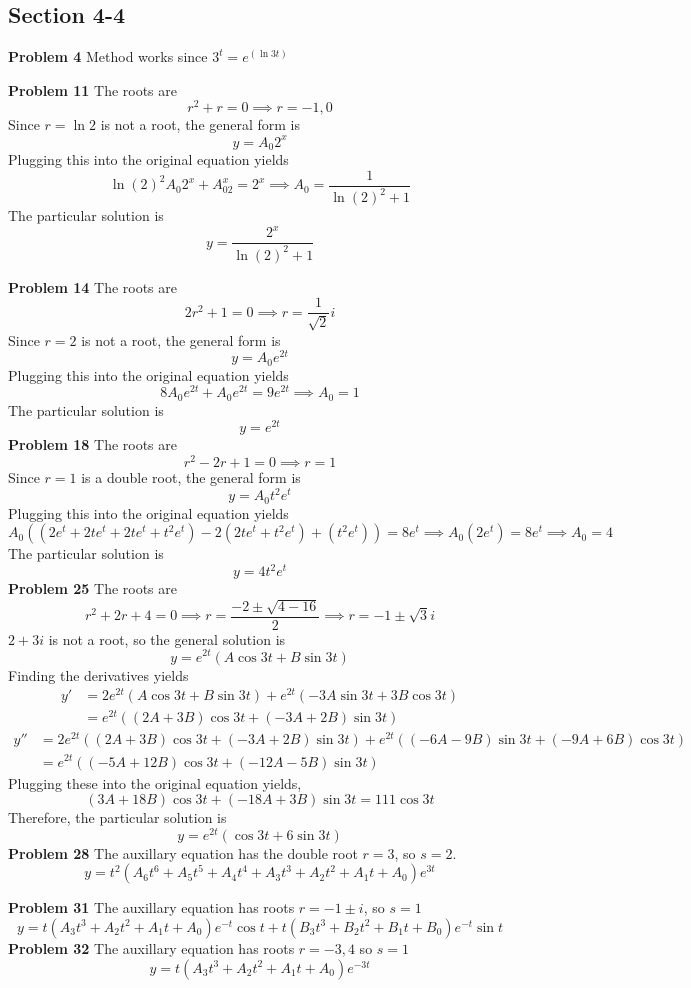 \subsection*{Section 4-4}
\textbf{Problem 4}
Method works since $3^t = e^(\ln 3 t)$

\textbf{Problem 11}
The roots are 
\[
    r^2 + r = 0 \implies r=-1, 0
\]
Since $r=\ln2$ is not a root, the general form is 
\[
    y = A_0 2^x
\]
Plugging this into the original equation yields 
\[
    \ln(2)^2 A_0 2^x + A_02^x = 2^x
    \implies A_0 = \frac{1}{\ln(2)^2+1}
\]
The particular solution is 
\[
    y = \frac{2^x}{\ln(2)^2+1}
\]

\textbf{Problem 14}
The roots are 
\[
    2r^2 + 1 = 0 \implies r = \frac{1}{\sqrt{2}}i
\]
Since $r = 2$ is not a root, the general form is 
\[
    y = A_0 e^{2t}
\]
Plugging this into the original equation yields 
\[
    8A_0e^{2t} + A_0 e^{2t} = 9e^{2t}
    \implies A_0 = 1
\]
The particular solution is 
\[
    y = e^{2t}
\]
\textbf{Problem 18}
The roots are 
\[
    r^2-2r+1 = 0
    \implies r=1
\]
Since $r=1$ is a double root, the general form is 
\[
    y = A_0 t^2e^t
\]
Plugging this into the original equation yields 
\[
    A_0((2e^t+ 2te^t + 2te^t + t^2e^t) - 2(2te^t + t^2e^t) + (t^2e^t)) = 8e^t
    \implies A_0(2e^t) = 8e^t
    \implies A_0 = 4
\]
The particular solution is 
\[
    y = 4 t^2e^t
\]
\textbf{Problem 25}
The roots are 
\[
    r^2 + 2r + 4 = 0 
    \implies r = \frac{-2 \pm \sqrt{4-16}}{2}
    \implies r = -1 \pm \sqrt{3}i
\]
$2 + 3i$ is not a root, so the general solution is 
\[
    y = e^{2t}(A \cos 3t + B \sin 3t)
\]
Finding the derivatives yields
\begin{align*}
    y' 
    &= 2e^{2t}(A \cos 3t + B \sin 3t) + e^{2t}(-3A \sin 3t + 3B \cos 3t) \\
    &= e^{2t}((2A+3B)\cos 3t + (-3A+2B) \sin 3t)
\end{align*}
\begin{align*}
    y''
    &= 2e^{2t}((2A+3B)\cos 3t + (-3A+2B) \sin 3t) + e^{2t}((-6A-9B)\sin 3t + (-9A+6B) \cos 3t) \\
    &= e^{2t}((-5A+12B)\cos 3t + (-12A-5B) \sin 3t)
\end{align*}
Plugging these into the original equation yields,
\[
    (3A+18B)\cos 3t + (-18A+3B)\sin 3t = 111 \cos 3t
\]
Therefore, the particular solution is 
\[
    y = e^{2t}(\cos 3t + 6 \sin 3t)
\]
\textbf{Problem 28}
The auxillary equation has the double root $r=3$, so $s=2$.
\[
    y = t^2(A_6t^6+A_5t^5+A_4t^4+A_3t^3+A_2t^2+A_1t+A_0)e^{3t}
\]

\textbf{Problem 31}
The auxillary equation has roots $r = -1 \pm i$, so $s=1$
\[
    y = t(A_3t^3+A_2t^2+A_1t+A_0)e^{-t}\cos t + 
    t(B_3t^3+B_2t^2+B_1t+B_0)e^{-t}\sin t 
\]
\textbf{Problem 32}
The auxillary equation has roots $r=-3, 4$ so $s=1$
\[
    y = t(A_3t^3+A_2t^2+A_1t+A_0)e^{-3t}
\]